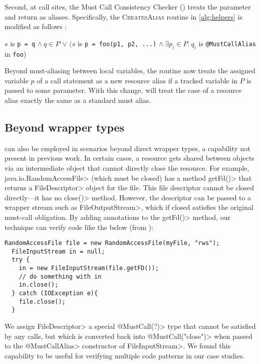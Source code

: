 Second, at call sites, the Must Call Consistency Checker
() treats the \mccannot parameter and return as
aliases.  Specifically, the \textsc{CreatesAlias} routine in \cref{alg:helpers} is
modified as follows :
\begin{algorithmic}
    \State \Return $s$ is \lstinline{p = q} $\wedge\ q \in P$ \newline
         \hspace*{4.5em} $\vee$ $(s$ is \lstinline{p = foo(p1, p2, ...)} \newline
         \hspace*{6em} $\wedge\ \exists p_i \in P.\ q_i$ is
         \lstinline{@MustCallAlias} in \lstinline{foo})
    \EndProcedure
\end{algorithmic}
Beyond must-aliasing between local variables, the routine now treats the
assigned variable $p$ of a call statement as a new resource alias if a tracked
variable in $P$ is passed to some \mccannot parameter.
With this change,  will treat the case of a
resource alias exactly the same as a standard must alias.

\subsection{Beyond wrapper types}

\mccannot can also be employed in scenarios beyond direct wrapper types, a
capability not present in previous work.  In certain cases, a resource gets
shared between objects via an intermediate object that cannot directly close the
resource.  For example, \<java.io.RandomAccessFile> (which must be closed) has
a method \<getFd()> that returns a \<FileDescriptor>
object for the file. This file
descriptor cannot be closed directly---it has no \<close()> method.
However, the descriptor can be passed to a wrapper stream such as
\<FileOutputStream>, which if closed satisfies the original must-call
obligation.  By adding \mccannot annotations to the \<getFd()> method, our
technique can verify code like the below (from ):
\begin{lstlisting}[frame=tb,belowskip=3mm]
  RandomAccessFile file = new RandomAccessFile(myFile, "rws");
  FileInputStream in = null;
  try {
    in = new FileInputStream(file.getFD());
    // do something with in  
    in.close();
  } catch (IOException e){
    file.close();
  }
\end{lstlisting}
We assign \<FileDescriptor> a special \<@MustCall(?)> type that cannot be satisfied by any calls,
but which is converted back into \<@MustCall("close")> when passed to the \<@MustCallAlias> constructor
of \<FileInputStream>. We found this capability to be
useful for verifying multiple code patterns in our case studies.

